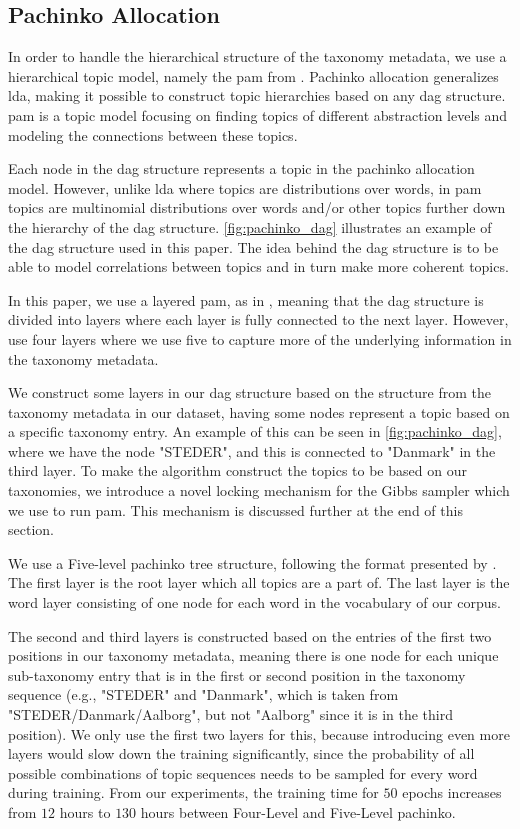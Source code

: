 \subsection{Pachinko Allocation}\label{subsec:pam}
In order to handle the hierarchical structure of the taxonomy metadata, we use a hierarchical topic model, namely the \acrfull{pam} from \citet{li2006pachinko}.
Pachinko allocation generalizes \gls{lda}, making it possible to construct topic hierarchies based on any \gls{dag} structure.
\gls{pam} is a topic model focusing on finding topics of different abstraction levels and modeling the connections between these topics.

Each node in the \gls{dag} structure represents a topic in the pachinko allocation model. 
However, unlike \gls{lda} where topics are distributions over words, in \gls{pam} topics are multinomial distributions over words and/or other topics further down the hierarchy of the \gls{dag} structure.
\autoref{fig:pachinko_dag} illustrates an example of the \gls{dag} structure used in this paper.
The idea behind the \gls{dag} structure is to be able to model correlations between topics and in turn make more coherent topics.
  
In this paper, we use a layered \gls{pam}, as in \cite{li2006pachinko}, meaning that the \gls{dag} structure is divided into layers where each layer is fully connected to the next layer.
However, \citet{li2006pachinko} use four layers where we use five to capture more of the underlying information in the taxonomy metadata.

We construct some layers in our \gls{dag} structure based on the structure from the taxonomy metadata in our dataset, having some nodes represent a topic based on a specific taxonomy entry.
An example of this can be seen in \autoref{fig:pachinko_dag}, where we have the node "STEDER", and this is connected to "Danmark" in the third layer.
To make the algorithm construct the topics to be based on our taxonomies, we introduce a novel locking mechanism for the Gibbs sampler which we use to run \gls{pam}.
This mechanism is discussed further at the end of this section.

We use a Five-level pachinko tree structure, following the format presented by \citet{li2006pachinko}.
The first layer is the root layer which all topics are a part of.
The last layer is the word layer consisting of one node for each word in the vocabulary of our corpus.

The second and third layers is constructed based on the entries of the first two positions in our taxonomy metadata, meaning there is one node for each unique sub-taxonomy entry that is in the first or second position in the taxonomy sequence (e.g., "STEDER" and "Danmark", which is taken from "STEDER/Danmark/Aalborg", but not "Aalborg" since it is in the third position).
We only use the first two layers for this, because introducing even more layers would slow down the training significantly, since the probability of all possible combinations of topic sequences needs to be sampled for every word during training.
From our experiments, the training time for $50$ epochs increases from $12$ hours to $130$ hours between Four-Level and Five-Level pachinko.

